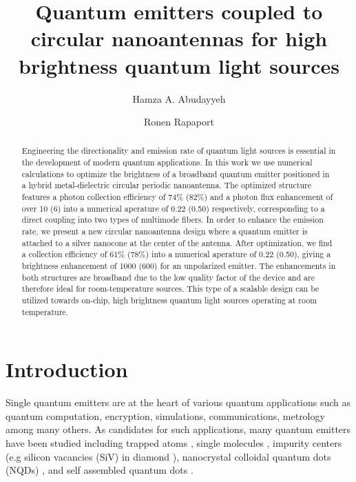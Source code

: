 \documentclass[10pt,onecolumn ]{article}
\begin{document}
\title{Quantum emitters coupled to circular nanoantennas for high brightness quantum light sources}
\author[1]{Hamza A. Abudayyeh}
\author[1,2]{Ronen Rapaport}
\date{}


\maketitle



\begin{abstract}
Engineering the  directionality and emission rate of quantum light sources is essential in the development of modern quantum applications. 
In this work we use numerical calculations to optimize the brightness of a broadband quantum emitter positioned in a hybrid metal-dielectric circular periodic nanoantenna.  
The optimized structure features a photon collection efficiency of $74\%$ ($82\%$) and a photon flux enhancement of over 10 (6) into a numerical aperature of 0.22 (0.50) respectively, corresponding to a direct coupling into two types of multimode fibers. 
In order to enhance the emission rate, we present a new circular nanoantenna design where a quantum emitter is attached to a silver nanocone at the center of the antenna. After optimization, we find a collection efficiency of $61\%$ ($78\%$)  into a numerical aperature of 0.22 (0.50), giving a brightness enhancement of 1000 (600) for an unpolarized emitter.
The enhancements in both structures are broadband due to the low quality factor of the device and are therefore ideal for room-temperature sources.
This type of a scalable design can be utilized towards on-chip, high brightness quantum light sources operating at room temperature.
\end{abstract}




\section{Introduction}

Single quantum emitters are at the heart of various quantum applications  such as quantum computation, encryption, simulations, communications, metrology among many others.\cite{OBrien2009PhotonicTechnologies,Dowling2003QuantumRevolution} 
As candidates for such applications, many quantum emitters have been studied \cite{Lounis2005} including trapped atoms \cite{Kimble1977PhotonFluorescence}, single molecules \cite{Treussart2001PhotonFilm},  impurity centers (e.g silicon vacancies (SiV) in diamond \cite{Neu2012PhotophysicsEmission}), nanocrystal colloidal quantum dots (NQDs) \cite{Lounis2000PhotonFluorescence}, and self assembled quantum dots \cite{Ding2016}. 
\end{document}
